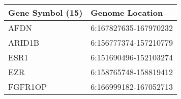 \begin{tabular}{ll}
\toprule
Gene Symbol (15) &       Genome Location \\
\midrule
            AFDN & 6:167827635-167970232 \\
          ARID1B & 6:156777374-157210779 \\
            ESR1 & 6:151690496-152103274 \\
             EZR & 6:158765748-158819412 \\
         FGFR1OP & 6:166999182-167052713 \\
\bottomrule
\end{tabular}
